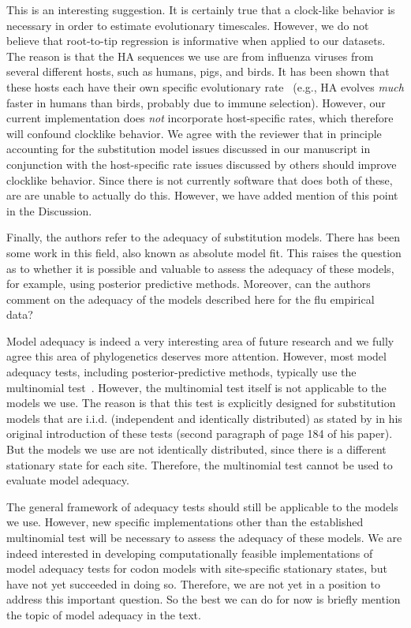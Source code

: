 \documentclass[11pt, oneside]{article}   	%
\newcommand{\response}[1]{{\color{black}#1}}
\begin{document}
\response{This is an interesting suggestion. 
It is certainly true that a clock-like behavior is necessary in order to estimate evolutionary timescales. 
However, we do not believe that root-to-tip regression is informative when applied to our datasets. 
The reason is that the HA sequences we use are from influenza viruses from several different hosts, such as humans, pigs, and birds. 
It has been shown that these hosts each have their own specific evolutionary rate~\citep{worobey2014synchronized} (e.g., HA evolves \emph{much} faster in humans than birds, probably due to immune selection).
However, our current implementation does \emph{not} incorporate host-specific rates, which therefore will confound clocklike behavior.
We agree with the reviewer that in principle accounting for the substitution model issues discussed in our manuscript in conjunction with the host-specific rate issues discussed by others should improve clocklike behavior.
Since there is not currently software that does both of these, are are unable to actually do this.
However, we have added mention of this point in the Discussion.
}

Finally, the authors refer to the adequacy of substitution models. 
There has been some work in this field, also known as absolute model fit. 
This raises the question as to whether it is possible and valuable to assess the adequacy of these models, for example, using posterior predictive methods. 
Moreover, can the authors comment on the adequacy of the models described here for the flu empirical data? 

\response{
Model adequacy is indeed a very interesting area of future research and we fully agree this area of phylogenetics deserves more attention. 
However, most model adequacy tests, including posterior-predictive methods, typically use the multinomial test~\citep{goldman1993statistical, brown2018evaluating}. 
However, the multinomial test itself is not applicable to the models we use.
The reason is that this test is explicitly designed for substitution models that are i.i.d. (independent and identically distributed) as stated by \citet{goldman1993statistical} in his original introduction of these tests (second paragraph of page 184 of his paper).
But the models we use are not identically distributed, since there is a different stationary state for each site.
Therefore, the multinomial test cannot be used to evaluate model adequacy.

The general framework of adequacy tests should still be applicable to the models we use.
However, new specific implementations other than the established multinomial test will be necessary to assess the adequacy of these models.
We are indeed interested in developing computationally feasible implementations of model adequacy tests for codon models with site-specific stationary states, but have not yet succeeded in doing so.
Therefore, we are not yet in a position to address this important question.
So the best we can do for now is briefly mention the topic of model adequacy in the text. 
}

\clearpage 
\color{black}

{\small

}
\end{document}
